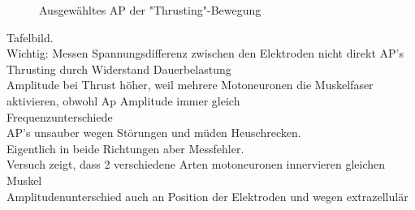 \begin{figure}[H]
\caption{Ausgewähltes AP der "{}Thrusting"{}-Bewegung}
\label{thrust-ap}
\end{figure}


Tafelbild.\\
Wichtig: Messen Spannungsdifferenz zwischen den Elektroden nicht direkt AP's\\
Thrusting durch Widerstand Dauerbelastung\\
Amplitude bei Thrust höher, weil mehrere Motoneuronen die Muskelfaser aktivieren, obwohl Ap Amplitude immer gleich\\
Frequenzunterschiede\\
AP's unsauber wegen Störungen und müden Heuschrecken.\\
Eigentlich in beide Richtungen aber Messfehler.\\
Versuch zeigt, dass 2 verschiedene Arten motoneuronen innervieren  gleichen  Muskel\\
Amplitudenunterschied auch an Position der Elektroden und wegen extrazellulär



